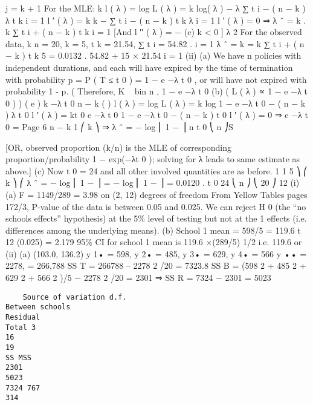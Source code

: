 \documentclass[a4paper,12pt]{article}
\begin{document}
j = k + 1
For the MLE:
k
l ( λ ) = log L ( λ ) = k log( λ ) − λ ∑ t i − ( n − k ) λ t k
i = 1
l ′ ( λ ) =
k k
− ∑ t i − ( n − k ) t k
λ i = 1
l ′ ( λ ) = 0 ⇒ λ ˆ =
k
.
k
∑ t i + ( n − k ) t k
i = 1
[And l ′′ ( λ ) = −
(c)
k
< 0 ]
λ 2
For the observed data,
k
n = 20, k = 5, t k = 21.54,
∑ t i = 54.82 .
i = 1
λ ˆ =
k
=
k
∑ t i + ( n − k ) t k
5
= 0.0132 .
54.82 + 15 × 21.54
i = 1
(ii)
(a)
We have n policies with independent durations, and each will have expired by the time of termination with probability
p = P ( T ≤ t 0 ) = 1 − e −λ t 0 ,
or will have not expired with probability 1 - p.
(
Therefore, K ~ bin n , 1 − e −λ t 0
(b)
(
L ( λ ) ∝ 1 − e −λ t 0
)
) ( e )
k
−λ t 0 n − k
(
)
l ( λ ) = log L ( λ ) = k log 1 − e −λ t 0 − ( n − k ) λ t 0
l ′ ( λ ) =
kt 0 e −λ t 0
1 − e −λ t 0
− ( n − k ) t 0
l ′ ( λ ) = 0 ⇒ e −λ t 0 =
Page 6
n − k
1
⎛ k ⎞
⇒ λ ˆ = − log ⎜ 1 − ⎟
n
t 0
⎝ n ⎠S

[OR, observed proportion (k/n) is the MLE of corresponding
proportion/probability {1 − exp(−λt 0 )}; solving for λ leads to same
estimate as above.]
(c)
Now t 0 = 24 and all other involved quantities are as before.
1
1
5 ⎞
⎛ k ⎞
⎛
λ ˆ = − log ⎜ 1 − ⎟ = − log ⎜ 1 − ⎟ = 0.0120 .
t 0
24
⎝ n ⎠
⎝ 20 ⎠
12
(i)
(a)
F = 1149/289 = 3.98 on (2, 12) degrees of freedom
From Yellow Tables pages 172/3, P-value of the data is between 0.05 and 0.025.
We can reject H 0 (the “no schools effects” hypothesis) at the 5\% level of testing but not at the 1%
effects (i.e. differences among the underlying means).
(b)
School 1 mean = 598/5 = 119.6
t 12 (0.025) = 2.179
95\% CI for school 1 mean is 119.6 ×(289/5) 1/2
i.e. 119.6  or
(ii)
(a)
(103.0, 136.2)
y 1• = 598, y 2• = 485, y 3• = 629, y 4• = 566
y •• = 2278, = 266,788
SS T = 266788 – 2278 2 /20 = 7323.8
SS B = (598 2 + 485 2 + 629 2 + 566 2 )/5 − 2278 2 /20 = 2301
⇒ SS R = 7324 − 2301 = 5023

\begin{verbatim}
    Source of variation d.f.
Between schools
Residual
Total 3
16
19
SS MSS
2301
5023
7324 767
314
\end{verbatim}
\end{document}

